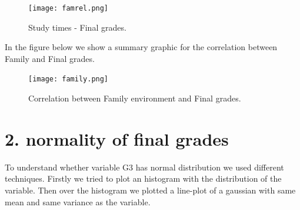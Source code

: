 \documentclass[a4paper, 11pt]{report}
\theoremstyle{definition}
\numberwithin{equation}{section}		%
\numberwithin{figure}{section}			%
\numberwithin{table}{section}				%
\begin{document}
\begin{itemize}
\begin{figure}[h]\centering
\texttt{[image: famrel.png]}
\caption{Study times - Final grades.}
\end{figure}


In the figure below we show a summary graphic for the correlation between Family and Final grades.
\begin{figure}[h]\centering
\texttt{[image: family.png]}
\caption{Correlation between Family environment and Final grades.}
\end{figure}



\end{itemize}




\section*{2. normality of final grades}

To understand whether variable G3 has normal distribution we used different
techniques. Firstly we tried to plot an histogram with the distribution of the variable. Then over the histogram we plotted a line-plot of a gaussian with same mean and same variance as the variable.
\end{document}
